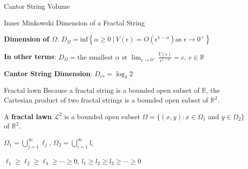 \documentclass{if-beamer}
\newcommand{\R}{\mathbb{R}}
\newcommand{\Om}{\Omega}
\begin{document}
\begin{frame}{Cantor String Volume}
	\begin{center}
	\end{center}
\end{frame}



\begin{frame}{Inner Minkowski Dimension of a Fractal String}

\begin{definition}
{\bf Dimension of $\Om$}: $D_\Om =\text{inf}\left\{ \alpha \geq 0\ |\ V(\epsilon)=O\left(\epsilon^{1-\alpha}\right) \text{as  } \epsilon \rightarrow 0^{+}\right\}$
\end{definition}

\pause
\vspace{.2 in}

{\bf In other terms}: $D_\Om = \text{the smallest  }\alpha \text{ st } \displaystyle \lim_{\epsilon \to 0^{+}} \frac{V(\epsilon)}{\epsilon^{1-\alpha}}=c, \ c\in \mathbb{R}$

\pause
\vspace{.2 in}

{\bf Cantor String Dimension}: $D_{cs} = \log_3 2$

\end{frame}



\begin{frame}{Fractal lawn}
Because a fractal string is a bounded open subset of $\R$, the Cartesian product of two fractal strings is a bounded open subset of $\R^2$.

\pause
\vspace{.2 in}

	\begin{definition}
	A {\bf fractal lawn} $\mathcal{L}^2$ is a bounded open subset $\Omega = \{(x,y): x \in \Omega_1$ and $y \in \Omega_2\}$ of $\R^2$.
	\end{definition}
	
\pause
\vspace{.2 in}

$\Omega_1 = \displaystyle\bigcup_{j = 1}^\infty\ell_j$, $\Omega_2 = \displaystyle\bigcup_{i = 1}^\infty l_i$

$\ell_1 \geq \ell_2 \geq \ell_3 \geq \cdots \geq 0$, $l_1 \geq l_2 \geq l_3 \geq \cdots \geq 0$
\end{frame}
\end{document}

